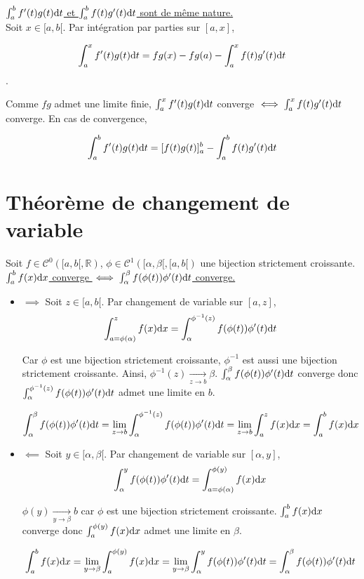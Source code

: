 \documentclass[]{article}
\begin{document}
\underline{$\int_{a}^{b}f'(t) g(t) \text{d}t$ et $\int_{a}^{b} f(t) g'(t) \text{d}t$ sont de même nature.} \\

Soit $x \in [a, b[$. Par intégration par parties sur $[a, x]$, 

\[ \int_{a}^{x} f'(t)g(t) \text{d}t = fg(x) - fg(a) - \int_{a}^{x} f(t) g'(t) \text{d}t \].

Comme $fg$ admet une limite finie, $\int_{a}^{x} f'(t)g(t) \text{d}t$ converge $\iff \int_{a}^{x} f(t) g'(t) \text{d}t$ converge. En cas de convergence,

\[ \int_{a}^{b} f'(t)g(t) \text{d}t = [f(t)g(t)]_a^b - \int_{a}^{b} f(t)g'(t) \text{d}t \]

\section{Théorème de changement de variable}

Soit $f \in \mathcal{C}^0([a, b[, \mathbb{R})$, $\phi \in \mathcal{C}^1([\alpha, \beta[, [a, b[)$ une bijection strictement croissante. \\

\underline{$\int_{a}^{b} f(x) \text{d}x$ converge $\iff \int_{\alpha}^{\beta} f(\phi(t)) \phi'(t) \text{d}t$ converge.} \\

\begin{itemize}
    \item $\boxed{\implies}$
    Soit $z \in [a, b[$. Par changement de variable sur $[a, z]$, 
    \[ \int_{a = \phi(\alpha)}^{z} f(x) \text{d}x = \int_{\alpha}^{\phi^{-1}(z)} f(\phi(t)) \phi'(t) \text{d}t \]

    Car $\phi$ est une bijection strictement croissante, $\phi^{-1}$ est aussi une bijection strictement croissante. Ainsi, $\phi^{-1}(z) \underset{z \rightarrow b}{\longrightarrow} \beta$. $\int_{\alpha}^{\beta} f(\phi(t)) \phi'(t) \text{d}t$ converge donc $\int_{\alpha}^{\phi^{-1}(z)} f(\phi(t)) \phi'(t) \text{d}t$ admet une limite en $b$. 

    \[ \int_{\alpha}^{\beta} f(\phi(t)) \phi'(t) \text{d}t = \lim_{z \rightarrow b} \int_{\alpha}^{\phi^{-1}(z)} f(\phi(t)) \phi'(t) \text{d}t = \lim_{z \rightarrow b} \int_{a}^{z} f(x) \text{d}x = \int_{a}^{b} f(x) \text{d}x \]

    \item $\boxed{\impliedby}$
    Soit $y \in [\alpha, \beta[$. Par changement de variable sur $[\alpha, y]$,
    \[ \int_{\alpha}^{y} f(\phi(t)) \phi'(t) \text{d}t = \int_{a = \phi(\alpha)}^{\phi(y)} f(x) \text{d}x \]

    $\phi(y) \underset{y \rightarrow \beta}{\longrightarrow} b$ car $\phi$ est une bijection strictement croissante. $\int_{a}^{b} f(x) \text{d}x$ converge donc $\int_{a}^{\phi(y)} f(x) \text{d}x$ admet une limite en $\beta$.

    \[ \int_{a}^{b} f(x) \text{d}x = \lim_{y \rightarrow \beta} \int_{a}^{\phi(y)} f(x) \text{d}x = \lim_{y \rightarrow \beta} \int_{\alpha}^{y} f(\phi(t)) \phi'(t) \text{d}t = \int_{\alpha}^{\beta} f(\phi(t)) \phi'(t) \text{d}t \]
\end{itemize}
\end{document}
